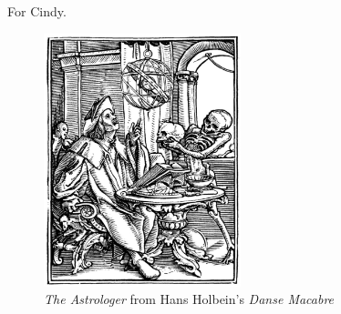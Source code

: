 
For Cindy.

\begin{figure}
    \vspace{50pt}
    \centering
    \includegraphics[width=0.51\textwidth]{frontmatter/holbein-astrologer.jpg}
    \\
    \emph{The Astrologer} from Hans Holbein's \emph{Danse Macabre}
\end{figure}